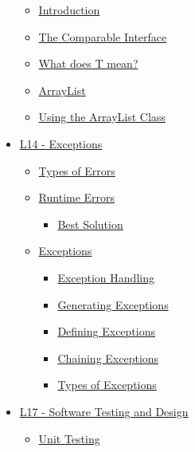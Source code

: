 \documentclass[]{article}
\providecommand{\tightlist}{%
  \setlength{\itemsep}{0pt}\setlength{\parskip}{0pt}}
\begin{document}
\begin{itemize}
  \begin{itemize}
  \tightlist
  \item
    \protect\hyperlink{introduction}{Introduction}
  \item
    \protect\hyperlink{the-comparable-interface}{The Comparable
    Interface}
  \item
    \protect\hyperlink{what-does-t-meanux3f}{What does T mean?}
  \item
    \protect\hyperlink{arraylist}{ArrayList}
  \item
    \protect\hyperlink{using-the-arraylist-class}{Using the ArrayList
    Class}
  \end{itemize}
\item
  \protect\hyperlink{l14---exceptions}{L14 - Exceptions}

  \begin{itemize}
  \tightlist
  \item
    \protect\hyperlink{types-of-errors}{Types of Errors}
  \item
    \protect\hyperlink{runtime-errors}{Runtime Errors}

    \begin{itemize}
    \tightlist
    \item
      \protect\hyperlink{best-solution}{Best Solution}
    \end{itemize}
  \item
    \protect\hyperlink{exceptions}{Exceptions}

    \begin{itemize}
    \tightlist
    \item
      \protect\hyperlink{exception-handling}{Exception Handling}
    \item
      \protect\hyperlink{generating-exceptions}{Generating Exceptions}
    \item
      \protect\hyperlink{defining-exceptions}{Defining Exceptions}
    \item
      \protect\hyperlink{chaining-exceptions}{Chaining Exceptions}
    \item
      \protect\hyperlink{types-of-exceptions}{Types of Exceptions}
    \end{itemize}
  \end{itemize}
\item
  \protect\hyperlink{l17---software-testing-and-design}{L17 - Software
  Testing and Design}

  \begin{itemize}
  \tightlist
  \item
    \protect\hyperlink{unit-testing}{Unit Testing}


\end{itemize}
\end{itemize}
\end{document}
